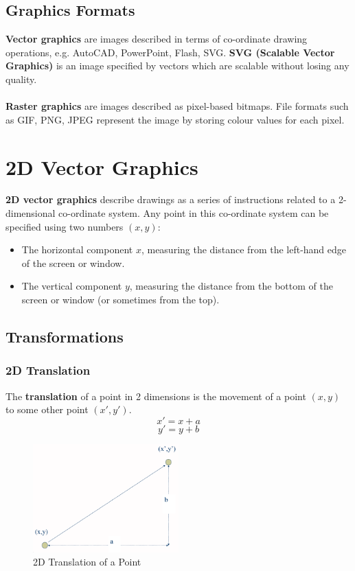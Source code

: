 \documentclass[a4paper,11pt]{article}
\begin{document}
\subsection{Graphics Formats}
\textbf{Vector graphics} are images described in terms of co-ordinate drawing operations, e.g. AutoCAD, PowerPoint, Flash, 
SVG.
\textbf{SVG (Scalable Vector Graphics)} is an image specified by vectors which are scalable without losing any quality.
\\\\
\textbf{Raster graphics} are images described as pixel-based bitmaps.
File formats such as GIF, PNG, JPEG represent the image by storing colour values for each pixel.

\section{2D Vector Graphics}
\textbf{2D vector graphics} describe drawings as a series of instructions related to a 2-dimensional co-ordinate system.
Any point in this co-ordinate system can be specified using two numbers $(x, y)$:
\begin{itemize}
    \item   The horizontal component $x$, measuring the distance from the left-hand edge of the screen or window.
    \item   The vertical component $y$, measuring the distance from the bottom of the screen or window (or sometimes from the
            top).
\end{itemize}

\subsection{Transformations}
\subsubsection{2D Translation}
The \textbf{translation} of a point in 2 dimensions is the movement of a point $(x,y)$ to some other point $(x', y')$.
$$
x' = x + a
$$
$$
y' = y + b
$$

\begin{figure}[H]
    \centering
    \includegraphics[width=0.5\textwidth]{images/2d_translation.png}
    \caption{2D Translation of a Point}
\end{figure}
\end{document}
